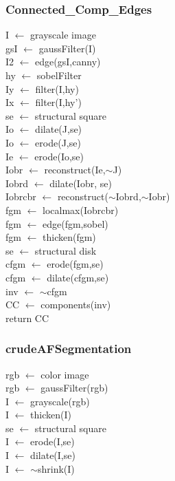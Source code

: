 \documentclass[12pt]{article}
\begin{document}
\subsubsection*{Connected\_Comp\_Edges}
\begin{addmargin}[12em]{1em}
	I $\leftarrow$ grayscale image \\
	gsI $\leftarrow$ gaussFilter(I) \\
	I2 $\leftarrow$ edge(gsI,canny) \\
	hy $\leftarrow$ sobelFilter \\
	Iy $\leftarrow$ filter(I,hy) \\
	Ix $\leftarrow$ filter(I,hy') \\
	se $\leftarrow$ structural square \\
	Io $\leftarrow$ dilate(J,se) \\
	Io $\leftarrow$ erode(J,se) \\
	Ie $\leftarrow$ erode(Io,se) \\
	Iobr $\leftarrow$ reconstruct(Ie,$\sim$J) \\
	Iobrd $\leftarrow$ dilate(Iobr, se) \\
	Iobrcbr $\leftarrow$ reconstruct($\sim$Iobrd,$\sim$Iobr) \\
	fgm $\leftarrow$ localmax(Iobrcbr) \\
	fgm $\leftarrow$ edge(fgm,sobel) \\
	fgm $\leftarrow$ thicken(fgm) \\
	se $\leftarrow$ structural disk \\
	cfgm $\leftarrow$ erode(fgm,se) \\
	cfgm $\leftarrow$ dilate(cfgm,se) \\
	inv $\leftarrow$ $\sim$cfgm \\
	CC $\leftarrow$ components(inv) \\
	return CC \\		
\end{addmargin}

\subsubsection*{crudeAFSegmentation}
\begin{addmargin}[12em]{1em}
	rgb $\leftarrow$ color image \\
	rgb $\leftarrow$ gaussFilter(rgb) \\
	I $\leftarrow$ grayscale(rgb) \\
	I $\leftarrow$ thicken(I) \\ 
	se $\leftarrow$ structural square \\
	I $\leftarrow$ erode(I,se) \\
	I $\leftarrow$ dilate(I,se) \\
	I $\leftarrow$ $\sim$shrink(I) \\ 
\end{addmargin}
\end{document}
